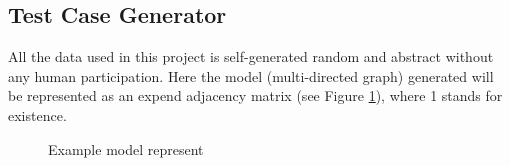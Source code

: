 \subsection{Test Case Generator}\label{sec:generator ds}
All the data used in this project is self-generated random and abstract without any human participation.
Here the model (multi-directed graph) generated will be represented as an expend adjacency matrix (see Figure \ref{fig:exp:model_represent}), where 1 stands for existence.
\begin{figure}[h]
    \centering
    \caption{Example model represent}
    \label{fig:exp:model_represent}
\end{figure}

